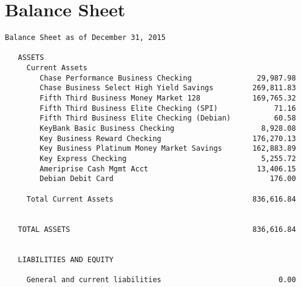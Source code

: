 \documentclass[letterpaper]{report}
\begin{document}
\section{Balance Sheet}

\begin{verbatim}
Balance Sheet as of December 31, 2015

   ASSETS
     Current Assets
        Chase Performance Business Checking               29,987.98
        Chase Business Select High Yield Savings         269,811.83
        Fifth Third Business Money Market 128            169,765.32
        Fifth Third Business Elite Checking (SPI)             71.16
        Fifth Third Business Elite Checking (Debian)          60.58
        KeyBank Basic Business Checking                    8,928.08
        Key Business Reward Checking                     176,270.13
        Key Business Platinum Money Market Savings       162,883.89
        Key Express Checking                               5,255.72
        Ameriprise Cash Mgmt Acct                         13,406.15
        Debian Debit Card                                    176.00

     Total Current Assets                                836,616.84


   TOTAL ASSETS                                          836,616.84


   LIABILITIES AND EQUITY

     General and current liabilities                           0.00


\end{verbatim}
\end{document}
